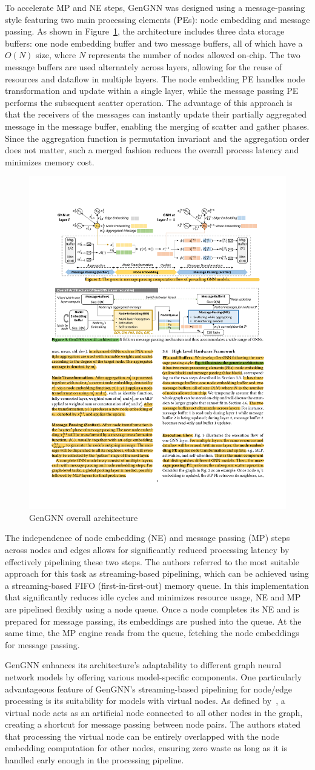 To accelerate MP and NE steps, GenGNN was designed using a message-passing style featuring two main processing elements (PEs): node embedding and message passing.
As shown in Figure~\ref{fig:gengnn_architecture}, the architecture includes three data storage buffers: one node embedding buffer and two message buffers, all of which have a $O(N)$ size, where $N$ represents the number of nodes allowed on-chip.
The two message buffers are used alternately across layers, allowing for the reuse of resources and dataflow in multiple layers.
The node embedding PE handles node transformation and update within a single layer, while the message passing PE performs the subsequent scatter operation.
The advantage of this approach is that the receivers of the messages can instantly update their partially aggregated message in the message buffer, enabling the merging of scatter and gather phases.
Since the aggregation function is permutation invariant and the aggregation order does not matter, such a merged fashion reduces the overall process latency and minimizes memory cost.

\begin{figure}[t]
    \centering
    \includegraphics[height=0.22\textwidth]{Images/GenGNN_architecture}
    \caption{GenGNN overall architecture~\cite{DBLP:journals/corr/abs-2201-08475}}
    \label{fig:gengnn_architecture}
\end{figure}

The independence of node embedding (NE) and message passing (MP) steps across nodes and edges allows for significantly reduced processing latency by effectively pipelining these two steps.
The authors referred to the most suitable approach for this task as streaming-based pipelining, which can be achieved using a streaming-based FIFO (first-in-first-out) memory queue.
In this implementation that significantly reduces idle cycles and minimizes resource usage, NE and MP are pipelined flexibly using a node queue.
Once a node completes its NE and is prepared for message passing, its embeddings are pushed into the queue.
At the same time, the MP engine reads from the queue, fetching the node embeddings for message passing.

GenGNN enhances its architecture's adaptability to different graph neural network models by offering various model-specific components.
One particularly advantageous feature of GenGNN's streaming-based pipelining for node/edge processing is its suitability for models with virtual nodes.
As defined by~\cite{DBLP:journals/corr/GilmerSRVD17}, a virtual node acts as an artificial node connected to all other nodes in the graph, creating a shortcut for message passing between node pairs.
The authors stated that processing the virtual node can be entirely overlapped with the node embedding computation for other nodes, ensuring zero waste as long as it is handled early enough in the processing pipeline.

